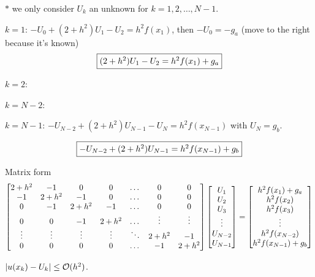 \documentclass[]{article}
\begin{document}
$*$ we only consider $U_k$ an unknown for $k=1,2,\dots,N-1$.

\ul{$k=1$}: $-U_0+(2+h^2)U_1-U_2=h^2f(x_1)$, then $-U_0=-g_a$ (move to the right because it's known) $$\fbox{$(2+h^2)U_1-U_2=h^2f(x_1)+g_a$}$$

\ul{$k=2$}: 

\ul{$k=N-2$}: 

\ul{$k=N-1$}: $-U_{N-2} + (2+h^2)U_{N-1} - U_N = h^2f(x_{N-1})$ with $U_N=g_b$.

$$\fbox{$-U_{N-2}+(2+h^2)U_{N-1} = h^2f(x_{N-1}) + g_b$}$$

Matrix form 
$$\begin{bmatrix}2+h^2 & -1 & 0 & 0 &\dots &0 & 0 \\ 
	-1 & 2+h^2 & -1 & 0 & \dots & 0 & 0 \\
	0 & -1 & 2+h^2 & -1 & \dots & 0 & 0 \\
	0 & 0 & -1 & 2+h^2 & \dots  & \vdots & \vdots \\
	\vdots & \vdots  & \vdots & \vdots & \ddots & 2+h^2 & -1 \\
0 & 0 & 0 & 0 & \dots & -1 & 2+h^2\end{bmatrix}\begin{bmatrix}U_1\\U_2\\U_3\\\vdots\\U_{N-2}\\U_{N-1}\end{bmatrix} = \begin{bmatrix}h^2f(x_1) + g_a \\ h^2f(x_2) \\ h^2f(x_3) \\ \vdots \\ h^2f(x_{N-2}) \\ h^2f(x_{N-1})+g_b\end{bmatrix} $$
\begin{fact}
	$|u(x_k)-U_k|\leq \mathcal{O}(h^2)$.
\end{fact}
\end{document}
